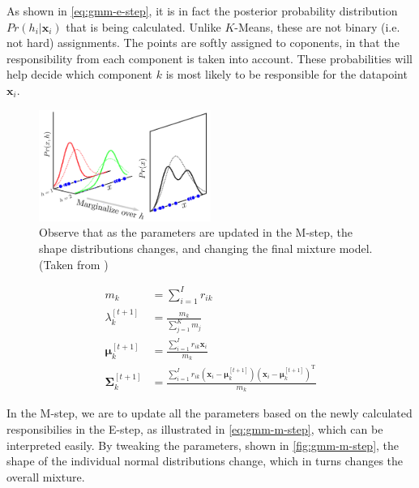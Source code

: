 \documentclass[11pt,openright,a4paper]{article}
\numberwithin{equation}{section}
\begin{document}
As shown in \autoref{eq:gmm-e-step}, it is in fact the posterior probability distribution $Pr(h_i|\boldsymbol{x}_i)$ that is being calculated. Unlike $K$-Means, these are not binary (i.e. not hard) assignments. The points are softly assigned to coponents, in that the responsibility from each component is taken into account. These probabilities will help decide which component $k$ is most likely to be responsible for the datapoint $\boldsymbol{x}_i$.


\begin{figure}[H]
  \centering
  \includegraphics[width=0.5\textwidth]{gmm-m-step}
    \caption{Observe that as the parameters are updated in the M-step, the shape distributions changes, and changing the final mixture model. (Taken from \cite{prince})}
  \label{fig:gmm-m-step}
\end{figure} 

\begin{equation}
    \label{eq:gmm-m-step}
    \begin{aligned}
        m_{k} &= \sum_{i=1}^{I} r_{ik} \\ 
        \lambda_{k}^{\left[t+1\right]} &= \frac{m_{k}}{\sum_{j=1}^{K} m_{j}} \\
        \boldsymbol\mu_{k}^{\left[t+1\right]} &= \frac{\sum_{i=1}^{I} r_{ik} \boldsymbol{x}_{i}}{m_{k}} \\
        \boldsymbol\Sigma_{k}^{\left[t+1\right]} &= 
            \frac{\sum_{i=1}^{I} r_{ik} 
                    \left(\boldsymbol{x}_{i} - \boldsymbol{\mu}_{k}^{\left[t+1\right]}\right)
                    \left(\boldsymbol{x}_{i} - \boldsymbol{\mu}_{k}^{\left[t+1\right] }\right)^\mathrm{T}}
                {m_{k}}
    \end{aligned}
\end{equation}

In the M-step, we are to update all the parameters based on the newly calculated responsibilies in the E-step, as illustrated in \autoref{eq:gmm-m-step}, which can be interpreted easily. By tweaking the parameters, shown in \autoref{fig:gmm-m-step}, the shape of the individual normal distributions change, which in turns changes the overall mixture. 
\end{document}
